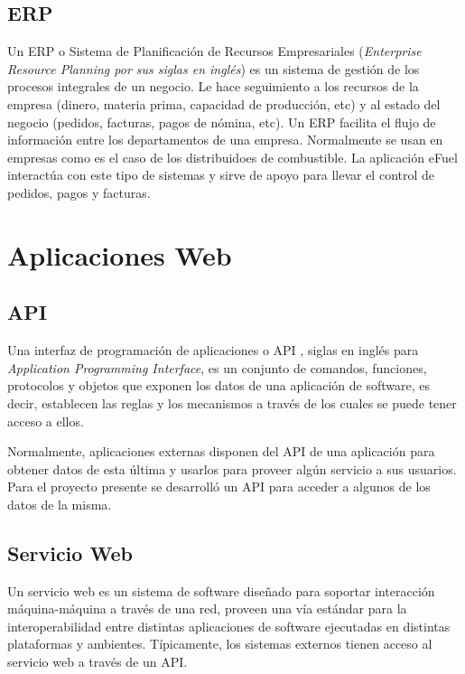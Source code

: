     \subsection{ERP} \label{erp}
    Un ERP \cite{internetEncyclopedia} o Sistema de Planificación de Recursos Empresariales (\emph{Enterprise Resource Planning por sus siglas en inglés}) es un sistema de gestión de los procesos integrales de un negocio. Le hace seguimiento a los recursos de la empresa (dinero, materia prima, capacidad de producción, etc) y al estado del negocio (pedidos, facturas, pagos de nómina, etc). Un ERP facilita el flujo de información entre los departamentos de una empresa. Normalmente se usan en empresas como es el caso de los distribuidoes de combustible. La aplicación eFuel interactúa con este tipo de sistemas y sirve de apoyo para llevar el control de pedidos, pagos y facturas.

\section{Aplicaciones Web}
    \subsection{API}
    Una interfaz de programación de aplicaciones o API \cite{apiChristensson}, siglas en inglés para \textit{Application Programming Interface}, es un conjunto de comandos, funciones, protocolos y objetos que exponen los datos de una aplicación de software, es decir, establecen las reglas y los mecanismos a través de los cuales se puede tener acceso a ellos.

    Normalmente, aplicaciones externas disponen del API de una aplicación para obtener datos de esta última y usarlos para proveer algún servicio a sus usuarios. Para el proyecto presente se desarrolló un API para acceder a algunos de los datos de la misma.

    \subsection{Servicio Web} \label{webService}
    Un servicio web \cite{webServiceW3C} es un sistema de software diseñado para soportar interacción máquina-máquina a través de una red, proveen una vía estándar para la interoperabilidad entre distintas aplicaciones de software ejecutadas en distintas plataformas y ambientes. Típicamente, los sistemas externos tienen acceso al servicio web a través de un API.


